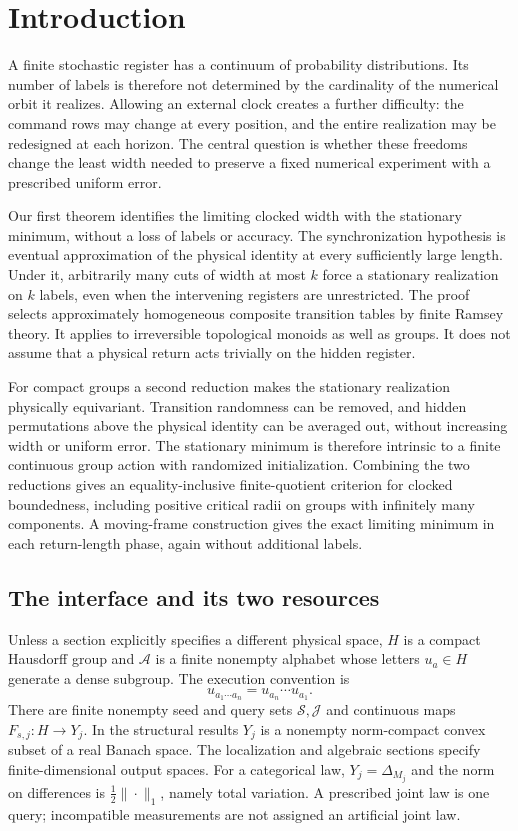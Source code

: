 \section{Introduction}
A finite stochastic register has a continuum of probability distributions. Its number of labels is therefore not determined by the cardinality of the numerical orbit it realizes. Allowing an external clock creates a further difficulty: the command rows may change at every position, and the entire realization may be redesigned at each horizon. The central question is whether these freedoms change the least width needed to preserve a fixed numerical experiment with a prescribed uniform error.

Our first theorem identifies the limiting clocked width with the stationary minimum, without a loss of labels or accuracy. The synchronization hypothesis is eventual approximation of the physical identity at every sufficiently large length. Under it, arbitrarily many cuts of width at most $k$ force a stationary realization on $k$ labels, even when the intervening registers are unrestricted. The proof selects approximately homogeneous composite transition tables by finite Ramsey theory. It applies to irreversible topological monoids as well as groups. It does not assume that a physical return acts trivially on the hidden register.

For compact groups a second reduction makes the stationary realization physically equivariant. Transition randomness can be removed, and hidden permutations above the physical identity can be averaged out, without increasing width or uniform error. The stationary minimum is therefore intrinsic to a finite continuous group action with randomized initialization. Combining the two reductions gives an equality-inclusive finite-quotient criterion for clocked boundedness, including positive critical radii on groups with infinitely many components. A moving-frame construction gives the exact limiting minimum in each return-length phase, again without additional labels.

\subsection{The interface and its two resources}
Unless a section explicitly specifies a different physical space, $H$ is a compact Hausdorff group and $\mathcal A$ is a finite nonempty alphabet whose letters $u_a\in H$ generate a dense subgroup. The execution convention is
\[
                  u_{a_1\cdots a_n}=u_{a_n}\cdots u_{a_1}.
\]
There are finite nonempty seed and query sets $\mathcal S,\mathcal J$ and continuous maps $F_{s,j}:H\to Y_j$. In the structural results $Y_j$ is a nonempty norm-compact convex subset of a real Banach space. The localization and algebraic sections specify finite-dimensional output spaces. For a categorical law, $Y_j=\Delta_{M_j}$ and the norm on differences is $\frac12\|\cdot\|_1$, namely total variation. A prescribed joint law is one query; incompatible measurements are not assigned an artificial joint law.

